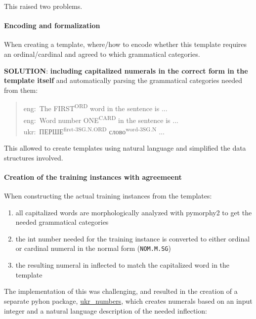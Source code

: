 This raised two problems.

\paragraph{Encoding and formalization}\label{encoding-and-formalization}

When creating a template, where/how to encode whether this template
requires an ordinal/cardinal and agreed to which grammatical categories.

\textbf{SOLUTION}: \textbf{including capitalized numerals in the correct
form in the template itself} and automatically parsing the grammatical
categories needed from them:

\begin{quote}
eng: The FIRST\textsuperscript{ORD} word in the sentence is ...\\
eng: Word number ONE\textsuperscript{CARD} in the sentence is ...\\
ukr: ПЕРШЕ\textsuperscript{first-3SG.N.ORD} слово\textsuperscript{word-3SG.N} ...
\end{quote}

This allowed to create templates using natural language and simplified
the data structures involved.

\paragraph{Creation of the training instances with
agreemeent}\label{creation-of-the-training-instances-with-agreemeent}

When constructing the actual training instances from the templates:

\begin{enumerate}
\def\labelenumi{\arabic{enumi}.}
\tightlist
\item
  all capitalized words are morphologically analyzed with pymorphy2 to
  get the needed grammatical categories
\item
  the int number needed for the training instance is converted to either
  ordinal or cardinal numeral in the normal form (\texttt{NOM.M.SG})
\item
  the resulting numeral in inflected to match the capitalized word in
  the template
\end{enumerate}

The implementation of this was challenging, and resulted in the creation
of a separate pyhon package,
\href{https://github.com/pchr8/ukr_numbers/}{ukr\_numbers}, which
creates numerals based on an input integer and a natural language
description of the needed inflection:

